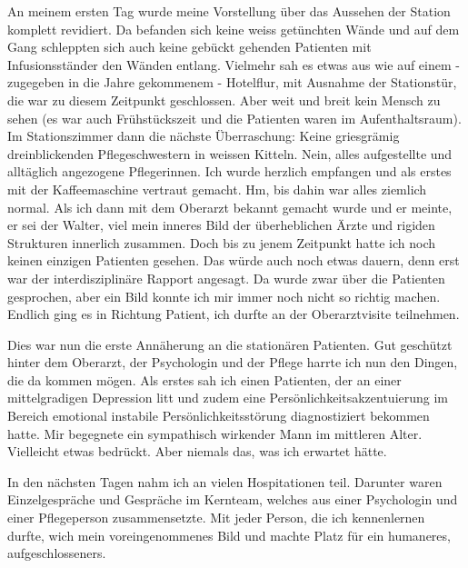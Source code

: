 An meinem ersten Tag wurde meine Vorstellung über das Aussehen der Station komplett revidiert. Da befanden sich keine weiss getünchten Wände und auf dem Gang schleppten sich auch keine gebückt gehenden Patienten mit Infusionsständer den Wänden entlang. Vielmehr sah es etwas aus wie auf einem - zugegeben in die Jahre gekommenem - Hotelflur, mit Ausnahme der Stationstür, die war zu diesem Zeitpunkt geschlossen. Aber weit und breit kein Mensch zu sehen (es war auch Frühstückszeit und die Patienten waren im Aufenthaltsraum). Im Stationszimmer dann die nächste Überraschung: Keine griesgrämig dreinblickenden Pflegeschwestern in weissen Kitteln. Nein, alles aufgestellte und alltäglich angezogene Pflegerinnen. Ich wurde herzlich empfangen und als erstes mit der Kaffeemaschine vertraut gemacht. Hm, bis dahin war alles ziemlich normal. Als ich dann mit dem Oberarzt bekannt gemacht wurde und er meinte, er sei der Walter, viel mein inneres Bild der überheblichen Ärzte und rigiden Strukturen innerlich zusammen. Doch bis zu jenem Zeitpunkt hatte ich noch keinen einzigen Patienten gesehen. Das würde auch noch etwas dauern, denn erst war der interdisziplinäre Rapport angesagt. Da wurde zwar über die Patienten gesprochen, aber ein Bild konnte ich mir immer noch nicht so richtig machen. Endlich ging es in Richtung Patient, ich durfte an der Oberarztvisite teilnehmen. 

Dies war nun die erste Annäherung an die stationären Patienten. Gut geschützt hinter dem Oberarzt, der Psychologin und der Pflege harrte ich nun den Dingen, die da kommen mögen. Als erstes sah ich einen Patienten, der an einer mittelgradigen Depression litt und zudem eine Persönlichkeitsakzentuierung im Bereich emotional instabile Persönlichkeitsstörung diagnostiziert bekommen hatte. Mir begegnete ein sympathisch wirkender Mann im mittleren Alter. Vielleicht etwas bedrückt. Aber niemals das, was ich erwartet hätte.  

In den nächsten Tagen nahm ich an vielen Hospitationen teil. Darunter waren Einzelgespräche und Gespräche im Kernteam, welches aus einer Psychologin und einer Pflegeperson zusammensetzte. Mit jeder Person, die ich kennenlernen durfte, wich mein voreingenommenes Bild und machte Platz für ein humaneres, aufgeschlosseners. 


